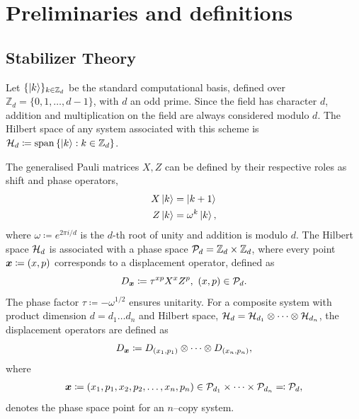 \documentclass[pra,
aps,
twocolumn,
superscriptaddress,
groupedaddress,
nofootinbib,
reprint
]{revtex4-1}
\begin{document}
\newpage
\section{Preliminaries and definitions}
\label{sec:ps}

\subsection{Stabilizer Theory}\label{sec:so}

Let $\{\ket{k}\}_{k \in \mathbb{Z}_d}$ be the standard computational basis, defined over $\mathbb{Z}_d = \{ 0, 1, \dots,d-1 \}$, with $d$ an odd prime. 
Since the field has character $d$, addition and multiplication on the field are always considered modulo $d$.
The Hilbert space of any system associated with this scheme is $\cal{H}_d \coloneqq \spanv{\ket{k}: k \in \mathbb{Z}_d}$.

The generalised Pauli matrices $X, Z$ can be defined by their respective roles as shift and phase operators,
\begin{align}
    X \ket{k} &= \ket{k + 1} \label{eq:xpauli}\\
	Z \ket{k} &= \omega^k \ket{k}, \label{eq:zpauli}
\end{align}
where $\omega \coloneqq e^{2\pi i/d}$ is the $d$-th root of unity and addition is modulo $d$. The Hilbert space $\cal{H}_d$ is associated with a phase space $\cal{P}_d = \mathbb{Z}_d \times \mathbb{Z}_d$, where every point $\bmx \coloneqq (x, p)$ corresponds to a displacement operator, defined as
\begin{equation}\label{eq:ddef}
    D_{\bmx} \coloneqq \tau^{x p} X^{x} Z^{p},\ (x, p) \in \cal{P}_d.
\end{equation}
The phase factor $\tau \coloneqq -\omega^{1/2}$ ensures unitarity.
For a composite system with product dimension $d = d_1 \dots d_n$ and Hilbert space, $\cal{H}_d = \cal{H}_{d_1} \otimes \dots \otimes \cal{H}_{d_n}$, the displacement operators are defined as
\begin{equation}\label{eq:composited}
    D_{\bmx} \coloneqq D_{(x_1, p_1)} \otimes \dots \otimes D_{(x_n, p_n)},
\end{equation}
where 
\begin{align*}
	\bmx \coloneqq (x_1, p_1, x_2, p_2, \dots, x_n, p_n) \in \cal{P}_{d_1} \times \dots \times \cal{P}_{d_n} \eqqcolon  \cal{P}_d,
\end{align*}
denotes the phase space point for an $n$--copy system.
\end{document}
